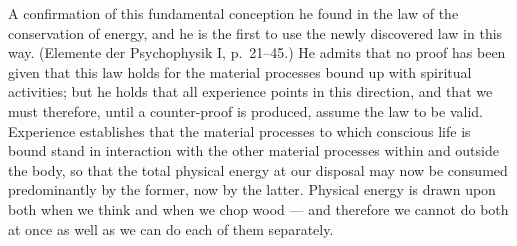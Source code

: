 \documentclass[12pt,a4paper]{book}
\newcommand{\opage}[1]{\marginnote{\footnotesize\textit{[#1]}}}
\begin{document}
A confirmation of this fundamental conception he found in the law of the
conservation of energy, and he is the first to use the newly discovered law in
this way. (Elemente der Psychophysik I, p.~21--45.) He admits that no proof has
been given that this law holds for the material processes bound up with spiritual
activities; but he holds that all experience points in this direction, and that
we must therefore, until a counter-proof is produced, assume the law to be valid.
Experience establishes that the material processes to which conscious life is
bound stand in interaction with the other material processes within and outside
the body, so that the total physical energy at our disposal may now be consumed
predominantly by the former, now by the latter. Physical energy is drawn upon
both when we think \opage{532}and when we chop wood --- and therefore we cannot do both at
once as well as we can do each of them separately.
\end{document}
